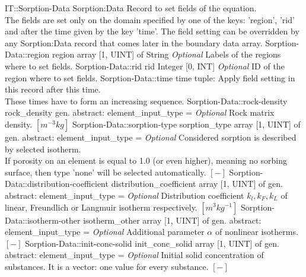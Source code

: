 \begin{RecordType}
	{IT::Sorption-Data}
	{Sorption:Data}
	{}%
	{}%
	{{{Record to set fields of the equation.}\\{
The fields are set only on the domain specified by one of the keys: 'region', 'rid'}\\{
and after the time given by the key 'time'. The field setting can be overridden by}\\{
 any Sorption:Data record that comes later in the boundary data array.}%
}}
		\RecKey
			{Sorption-Data::region}
			{region}
			{{array [1, UINT] of }{String}}{}
			{ \it{Optional}}
			{{{Labels of the regions where to set fields. }%
}}
		\RecKey
			{Sorption-Data::rid}
			{rid}
			{{Integer [0, INT]}}{}
			{ \it{Optional}}
			{{{ID of the region where to set fields.}%
}}
		\RecKey
			{Sorption-Data::time}
			{time}
			{{tuple: }}{}
			{ }
			{{{Apply field setting in this record after this time.}\\{
These times have to form an increasing sequence.}%
}}
		\RecKey
			{Sorption-Data::rock-density}
			{rock{\_}density}
			{{gen. abstract: }}{{element{\_}input{\_}type}{ = }}
			{ \it{Optional}}
			{{{Rock matrix density. }{$[m^{-3}kg]$}%
}}
		\RecKey
			{Sorption-Data::sorption-type}
			{sorption{\_}type}
			{{array [1, UINT] of }{gen. abstract: }}{{element{\_}input{\_}type}{ = }}
			{ \it{Optional}}
			{{{Considered sorption is described by selected isotherm.}\\{
If porosity on an element is equal to 1.0 (or even higher), meaning no sorbing surface, then type 'none' will be selected automatically. }{$[-]$}%
}}
		\RecKey
			{Sorption-Data::distribution-coefficient}
			{distribution{\_}coefficient}
			{{array [1, UINT] of }{gen. abstract: }}{{element{\_}input{\_}type}{ = }}
			{ \it{Optional}}
			{{{Distribution coefficient }{ $k_l, k_F, k_L $}{ of linear, Freundlich or Langmuir isotherm respectively. }{$[m^{3}kg^{-1}]$}%
}}
		\RecKey
			{Sorption-Data::isotherm-other}
			{isotherm{\_}other}
			{{array [1, UINT] of }{gen. abstract: }}{{element{\_}input{\_}type}{ = }}
			{ \it{Optional}}
			{{{Additional parameter }{$ \alpha $}{ of nonlinear isotherms. }{$[-]$}%
}}
		\RecKey
			{Sorption-Data::init-conc-solid}
			{init{\_}conc{\_}solid}
			{{array [1, UINT] of }{gen. abstract: }}{{element{\_}input{\_}type}{ = }}
			{ \it{Optional}}
			{{{Initial solid concentration of substances.
It is a vector: one value for every substance. }{$[-]$}%
}}
\end{RecordType}
